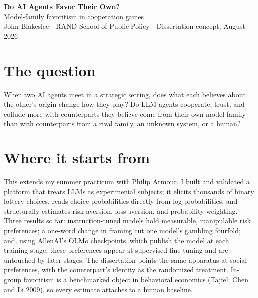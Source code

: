 \documentclass[10pt]{article}
\begin{document}
\enlargethispage{3\baselineskip}

{\LARGE\bfseries Do AI Agents Favor Their Own?}\\[2pt]
{\large Model-family favoritism in cooperation games}\\[3pt]
{\color{mutegray}\small John Blakeslee \,\textbullet\, RAND School of Public Policy \,\textbullet\, Dissertation concept, August 2026}

\section{The question}
When two AI agents meet in a strategic setting, does what each believes about the other's origin change how they play? Do LLM agents cooperate, trust, and collude more with counterparts they believe come from their own model family than with counterparts from a rival family, an unknown system, or a human?

\section{Where it starts from}
This extends my summer practicum with Philip Armour. I built and validated a platform that treats LLMs as experimental subjects; it elicits thousands of binary lottery choices, reads choice probabilities directly from log-probabilities, and structurally estimates risk aversion, loss aversion, and probability weighting. Three results so far: instruction-tuned models hold measurable, manipulable risk preferences; a one-word change in framing cut one model's gambling fourfold; and, using AllenAI's OLMo checkpoints, which publish the model at each training stage, these preferences appear at supervised fine-tuning and are untouched by later stages. The dissertation points the same apparatus at social preferences, with the counterpart's identity as the randomized treatment. In-group favoritism is a benchmarked object in behavioral economics (Tajfel; Chen and Li 2009), so every estimate attaches to a human baseline.
\end{document}
